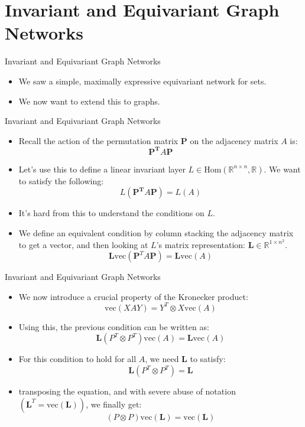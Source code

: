 \documentclass{beamer}
\begin{document}
\section{Invariant and Equivariant Graph Networks}

\begin{frame}{Invariant and Equivariant Graph Networks}
    \begin{itemize}
        \setlength{\itemsep}{\fill}
        \item We saw a simple, maximally expressive equivariant network for sets.
        \item We now want to extend this to graphs.
    \end{itemize}
\end{frame}
\begin{frame}{Invariant and Equivariant Graph Networks}
    \begin{itemize}
        \setlength{\itemsep}{\fill}
        \item Recall the action of the permutation matrix $\boldsymbol{P}$ on the adjacency matrix $A$ is:
        \[\boldsymbol{P^T}A\boldsymbol{P}\]
        \item Let's use this to define a linear invariant layer $L \in \text{Hom}(\mathbb{R}^{n\times n}, \mathbb{R})$. We want to satisfy the following:
        \[ L(\boldsymbol{P^T}A\boldsymbol{P}) = L(A) \]
        \item It's hard from this to understand the conditions on $L$. 
        \pause
        \item We define an equivalent condition by column stacking the adjacency matrix to get a vector, and then looking at $L$'s matrix representation: $\mathbf{L} \in \mathbb{R}^{1 \times n^2}$.
        \[ \mathbf{L}\text{vec}(\boldsymbol{P}^T A\boldsymbol{P}) = \mathbf{L}\text{vec}(A) \]
    \end{itemize}
\end{frame}
\begin{frame}{Invariant and Equivariant Graph Networks}
    \begin{itemize}
        \setlength{\itemsep}{\fill}
        \item We now introduce a crucial property of the Kronecker product:
        \[ \text{vec}(XAY)= Y^T\otimes X\text{vec}(A)\]
        \item Using this, the previous condition can be written as:
        \[ \mathbf{L}(P^T\otimes P^T)\text{vec}(A) = \mathbf{L}\text{vec}(A) \]
        \item For this condition to hold for all $A$, we need $\mathbf{L}$ to satisfy:
        \[ \mathbf{L}(P^T\otimes P^T) = \mathbf{L} \]
        \item transposing the equation, and with severe abuse of notation $(\mathbf{L}^T = \text{vec}(\mathbf{L}))$, we finally get:
        \[ (P\otimes P)\text{vec}(\mathbf{L}) = \text{vec}(\mathbf{L}) \]
    \end{itemize}
\end{frame}
\end{document}
